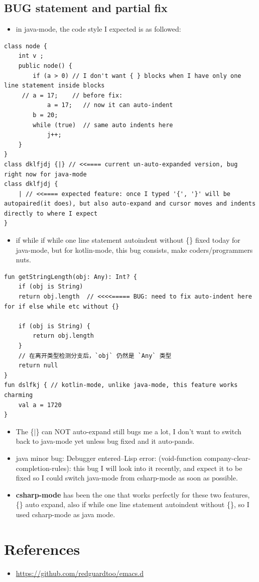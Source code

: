 \documentclass[9pt, b5paper]{article}
\begin{document}
\subsection{BUG statement and partial fix}
\label{sec:org38dfb29}
\begin{itemize}
\item in java-mode, the code style I expected is as followed:
\end{itemize}
\begin{verbatim}
class node {
    int v ;
    public node() {
        if (a > 0) // I don't want { } blocks when I have only one line statement inside blocks
     // a = 17;    // before fix:
            a = 17;   // now it can auto-indent
        b = 20;
        while (true)  // same auto indents here
            j++;
    }
}
class dklfjdj {|} // <<==== current un-auto-expanded version, bug right now for java-mode
class dklfjdj { 
    | // <<==== expected feature: once I typed '{', '}' will be autopaired(it does), but also auto-expand and cursor moves and indents directly to where I expect
}
\end{verbatim}
\begin{itemize}
\item if while if while one line statement autoindent without \{\} fixed today for java-mode, but for kotlin-mode, this bug consists, make coders/programmers nuts.
\end{itemize}
\begin{verbatim}
fun getStringLength(obj: Any): Int? {
    if (obj is String)
    return obj.length  // <<<<===== BUG: need to fix auto-indent here for if else while etc without {} 

    if (obj is String) {
        return obj.length
    }
    // 在离开类型检测分支后，`obj` 仍然是 `Any` 类型
    return null
}
fun dslfkj { // kotlin-mode, unlike java-mode, this feature works charming
    val a = 1720 
}
\end{verbatim}
\begin{itemize}
\item The \{|\} can NOT auto-expand still bugs me a lot, I don't want to switch back to java-mode yet unless bug fixed and it auto-pands.
\item java minor bug: Debugger entered--Lisp error: (void-function company-clear-completion-rules): this bug I will look into it recently, and expect it to be fixed so I could switch java-mode from csharp-mode as soon as possible.
\end{itemize}
\begin{itemize}
\item \textbf{csharp-mode} has been the one that works perfectly for these two features, \{\} auto expand, also if while one line statement autoindent without \{\}, so I used csharp-mode as java mode.
\end{itemize}
\section{References}
\label{sec:orgb5789eb}
\begin{itemize}
\item \url{https://github.com/redguardtoo/emacs.d}
\end{itemize}
\end{document}
